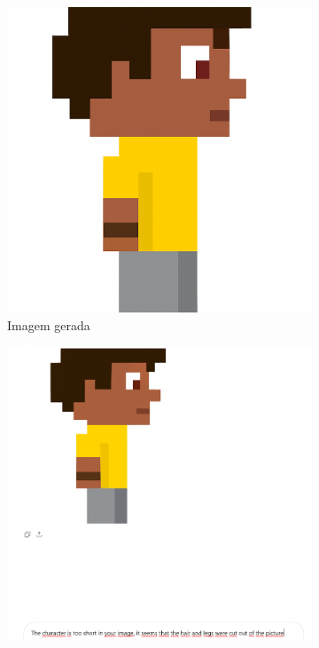 \begin{figure}[htbp]
\begin{subfigure}{0.2\linewidth}
        \includegraphics[width=1\linewidth]{figs/chatGPT/visao_lateral/res4.PNG}
        \caption{\small Imagem gerada}
        \label{fig:chatGPT3c}
    \end{subfigure}
    \begin{subfigure}{0.55\linewidth}
        \includegraphics[width=1\linewidth]{figs/chatGPT/visao_lateral/tela5.PNG}

\end{subfigure}
\end{figure}
